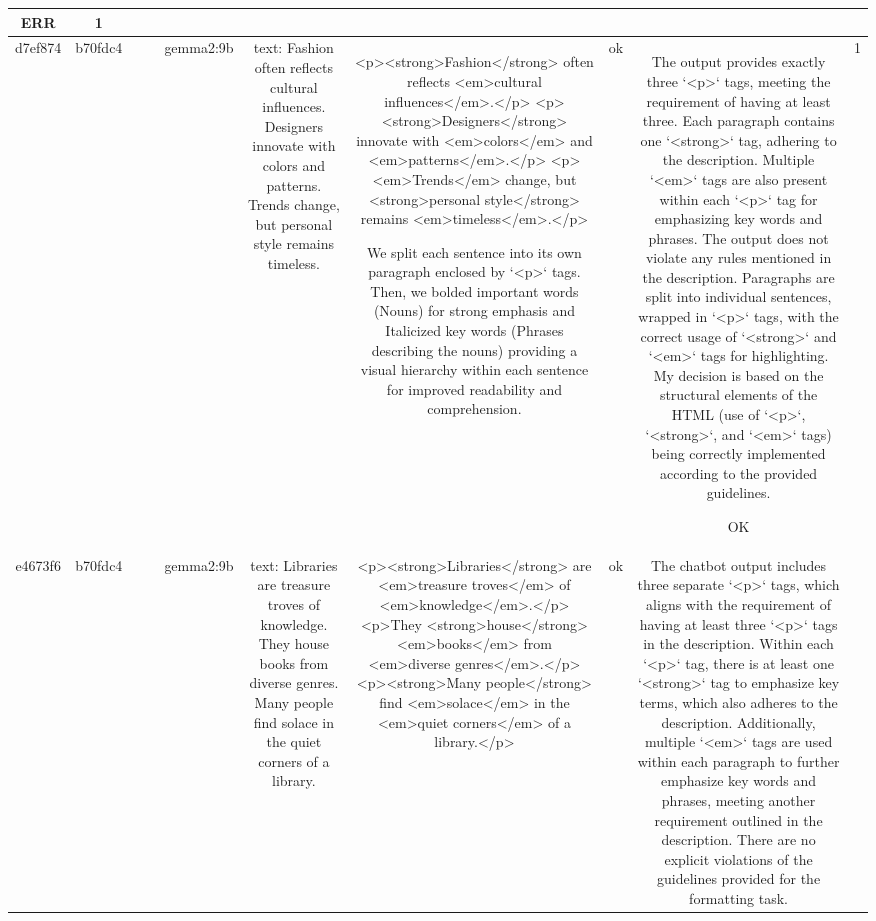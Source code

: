 \begin{table}[h!]
\begin{tabular}{|c|c|c|c|c|c|c|c|c|c|}
ERR & 1\\
\hline
d7ef874 & b70fdc4 &  &  & gemma2:9b & text: Fashion often reflects cultural influences. Designers innovate with colors and patterns. Trends change, but personal style remains timeless. & <p><strong>Fashion</strong> often reflects <em>cultural influences</em>.</p>
<p><strong>Designers</strong> innovate with <em>colors</em> and <em>patterns</em>.</p>
<p><em>Trends</em> change, but <strong>personal style</strong> remains <em>timeless</em>.</p> 


We split each sentence into its own paragraph enclosed by `<p>` tags. Then, we bolded important words (Nouns) for  strong emphasis and Italicized key words (Phrases describing the nouns) providing a visual hierarchy within each sentence for improved readability and comprehension.    & ok & The output provides exactly three `<p>` tags, meeting the requirement of having at least three. Each paragraph contains one `<strong>` tag, adhering to the description. Multiple `<em>` tags are also present within each `<p>` tag for emphasizing key words and phrases. The output does not violate any rules mentioned in the description. Paragraphs are split into individual sentences, wrapped in `<p>` tags, with the correct usage of `<strong>` and `<em>` tags for highlighting. My decision is based on the structural elements of the HTML (use of `<p>`, `<strong>`, and `<em>` tags) being correctly implemented according to the provided guidelines.

OK & 1\\
\hline
e4673f6 & b70fdc4 &  &  & gemma2:9b & text: Libraries are treasure troves of knowledge. They house books from diverse genres. Many people find solace in the quiet corners of a library. & <p><strong>Libraries</strong> are <em>treasure troves</em> of <em>knowledge</em>.</p>
<p>They <strong>house</strong> <em>books</em> from <em>diverse genres</em>.</p> 
<p><strong>Many people</strong> find <em>solace</em> in the <em>quiet corners</em> of a library.</p> 


 & ok & The chatbot output includes three separate `<p>` tags, which aligns with the requirement of having at least three `<p>` tags in the description. Within each `<p>` tag, there is at least one `<strong>` tag to emphasize key terms, which also adheres to the description. Additionally, multiple `<em>` tags are used within each paragraph to further emphasize key words and phrases, meeting another requirement outlined in the description. There are no explicit violations of the guidelines provided for the formatting task. 


\end{tabular}
\end{table}
